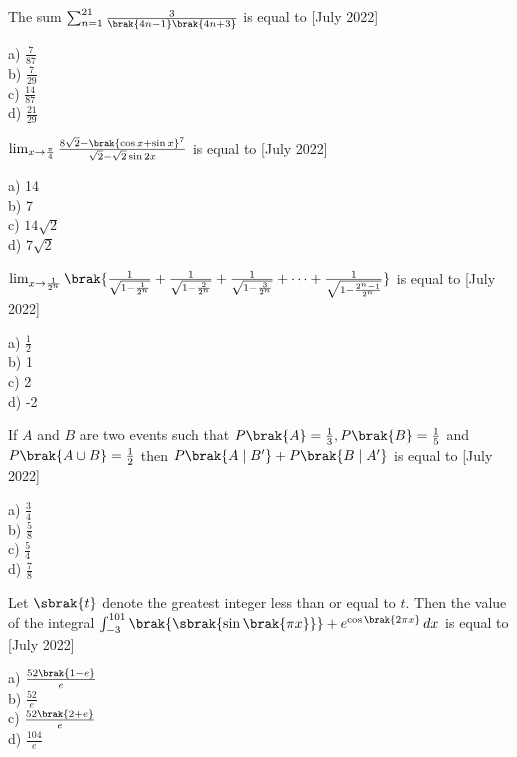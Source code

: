 \item The sum $\sum_{n=1}^{21} \frac{3}{\brak{4n-1}\brak{4n+3}}$ is equal to \hfill{[July 2022]}
\begin{multicols}{4}
    a) $\frac{7}{87}$\\
    b) $\frac{7}{29}$\\
    c) $\frac{14}{87}$\\
    d) $\frac{21}{29}$
\end{multicols}
\item $\lim_{x \to \frac{\pi}{4}} \frac{8\sqrt{2}-\brak{\cos x +\sin x}^7}{\sqrt{2}-\sqrt{2}\sin 2x}$ is equal to \hfill{[July 2022]}
\begin{multicols}{4}
    a) 14\\
    b) 7\\
    c) $14\sqrt{2}$\\
    d) $7\sqrt{2}$
\end{multicols}
\item $\lim_{x \to \frac{1}{2^n}} \brak{\frac{1}{\sqrt{1-\frac{1}{2^n}}}+\frac{1}{\sqrt{1-\frac{2}{2^n}}}+\frac{1}{\sqrt{1-\frac{3}{2^n}}}+\dots +\frac{1}{\sqrt{1-\frac{2^n -1}{2^n}}}}$ is equal to \hfill{[July 2022]}
\begin{multicols}{4}
    a) $\frac{1}{2}$\\
    b) 1\\
    c) 2\\
    d) -2
\end{multicols}
\item If $A$ and $B$ are two events such that $P\brak{A}=\frac{1}{3}, P\brak{B}=\frac{1}{5}$ and $P\brak{A\cup B}=\frac{1}{2}$ then $P\brak{A\mid B^{\prime}}+P\brak{B\mid A^{\prime}}$ is equal to \hfill{[July 2022]}
\begin{multicols}{4}
    a) $\frac{3}{4}$\\
    b) $\frac{5}{8}$\\
    c) $\frac{5}{4}$\\
    d) $\frac{7}{8}$
\end{multicols}
\item Let $\sbrak{t}$ denote the greatest integer less than or equal to $t$. Then the value of the integral $\int_{-3}^{101} \brak{\sbrak{\sin\brak{\pi x}}}+e^{\cos\brak{2\pi x}} \, dx$ is equal to \hfill{[July 2022]}
\begin{multicols}{4}
    a) $\frac{52\brak{1-e}}{e}$\\
    b) $\frac{52}{e}$\\
    c) $\frac{52\brak{2+e}}{e}$\\
    d) $\frac{104}{e}$
\end{multicols}
